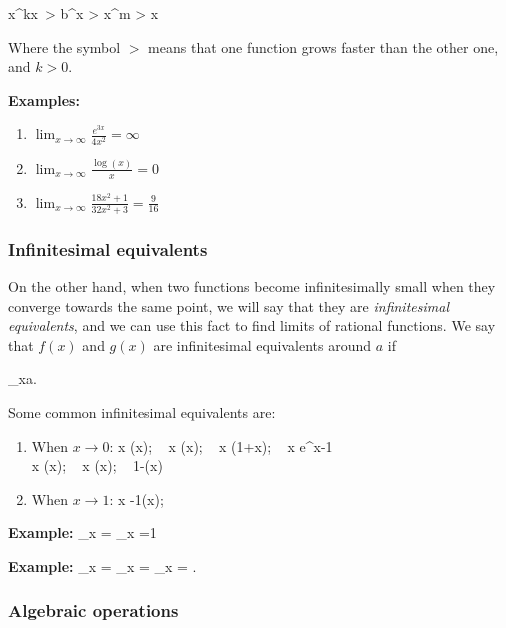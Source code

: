 \bnn
x^{kx}\  > b^x > x^m > \log x
\enn

Where the symbol $>$ means that one function grows faster than the other one, and $k>0$.

{\bf Examples:}
\begin{enumerate}
\item $\lim_{x\rightarrow \infty} \frac{e^{3x}}{4x^2}=\infty$
\item $\lim_{x\rightarrow \infty} \frac{\log(x)}{x}=0$
\item $\lim_{x\rightarrow \infty} \frac{18x^2+1}{32x^2+3}=\frac{9}{16}$
\end{enumerate}

\subsubsection{Infinitesimal equivalents}

On the other hand, when two functions become infinitesimally small when they
converge towards the same point, we will say that they are {\em infinitesimal equivalents},
and we can use this fact to find limits of rational functions. We say that $f(x)$ and 
$g(x)$ are infinitesimal equivalents around $a$ if

\bnn
	\lim_{x\rightarrow a}.	
\enn

Some common infinitesimal equivalents are:
\begin{enumerate}
 \item When $x \rightarrow 0$:
   \bnn
      x \simeq \sin(x); \mbox{  } x \simeq \tan(x); \mbox{  } x \simeq \log(1+x); \mbox{  } x \simeq e^x-1 \\
      x \simeq \arcsin(x); \mbox{  } x \simeq \arctan(x); \mbox{  } 1-\cos(x) \simeq {}
   \enn
    \item When $x \rightarrow 1$:
   \bnn
      x -1\simeq \log(x);
   \enn
\end{enumerate}

{\bf Example:}
\bnn
 	\lim_{x} = 	\lim_{x} =1
\enn

{\bf Example:}
\bnn
 	\lim_{x} = 	\lim_{x} = \lim_{x} = .
\enn

\subsubsection{Algebraic operations}

